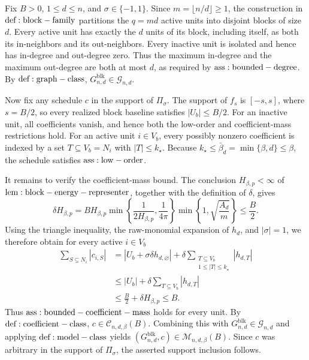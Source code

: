 Fix \(B>0\), \(1\le d\le n\), and \(\sigma\in\{-1,1\}\). Since \(m=\lfloor n/d\rfloor\ge1\), the construction in \({\rm def:block-family}\) partitions the \(q=md\) active units into disjoint blocks of size \(d\). Every active unit has exactly the \(d\) units of its block, including itself, as both its in-neighbors and its out-neighbors. Every inactive unit is isolated and hence has in-degree and out-degree zero. Thus the maximum in-degree and the maximum out-degree are both at most \(d\), as required by \({\rm ass:bounded-degree}\). By \({\rm def:graph-class}\), \(G_{n,d}^{\mathrm{blk}}\in\mathcal G_{n,d}\).

Now fix any schedule \(c\) in the support of \(\Pi_\sigma\). The support of \(f_s\) is \([-s,s]\), where \(s=B/2\), so every realized block baseline satisfies \(|U_b|\le B/2\). For an inactive unit, all coefficients vanish, and hence both the low-order and coefficient-mass restrictions hold. For an active unit \(i\in V_b\), every possibly nonzero coefficient is indexed by a set \(T\subseteq V_b=N_i\) with \(|T|\le k_\star\). Because \(k_\star\le\bar\beta_d=\min\{\beta,d\}\le\beta\), the schedule satisfies \({\rm ass:low-order}\).

It remains to verify the coefficient-mass bound. The conclusion \(H_{\beta,p}<\infty\) of \({\rm lem:block-energy-representer}\), together with the definition of \(\delta\), gives
\[
\delta H_{\beta,p}
=BH_{\beta,p}\min\!\left\{\frac{1}{2H_{\beta,p}},\frac{1}{4\pi}\right\}
\min\!\left\{1,\sqrt{\frac{A_d}{m}}\right\}
\le \frac B2.
\]
Using the triangle inequality, the raw-monomial expansion of \(h_d\), and \(|\sigma|=1\), we therefore obtain for every active \(i\in V_b\)
\[
\begin{aligned}
\sum_{S\subseteq N_i}|c_{i,S}|
&=\left|U_b+\sigma\delta h_{d,\varnothing}\right|
  +\delta\sum_{\substack{T\subseteq V_b\\1\le |T|\le k_\star}}|h_{d,T}|\\
&\le |U_b|+\delta\sum_{T\subseteq V_b}|h_{d,T}|\\
&\le \frac B2+\delta H_{\beta,p}\le B.
\end{aligned}
\]
Thus \({\rm ass:bounded-coefficient-mass}\) holds for every unit. By \({\rm def:coefficient-class}\), \(c\in\mathcal C_{n,d,\beta}(B)\). Combining this with \(G_{n,d}^{\mathrm{blk}}\in\mathcal G_{n,d}\) and applying \({\rm def:model-class}\) yields \((G_{n,d}^{\mathrm{blk}},c)\in\mathcal M_{n,d,\beta}(B)\). Since \(c\) was arbitrary in the support of \(\Pi_\sigma\), the asserted support inclusion follows.